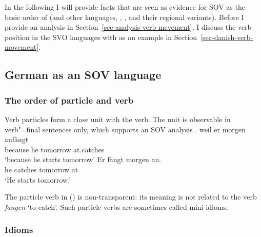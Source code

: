 
In the following I will provide facts that are seen as evidence for SOV as the basic order of 
(and other  languages, \eg {}, ,  and their regional
variants). Before I provide an analysis in Section~\ref{sec-analysis-verb-mevement}, I discuss the 
verb position in the  SVO languages with  as an example in Section~\ref{sec-danish-verb-movement}.

\subsection{German as an SOV language}
\label{sec-German-as-SOV}

\subsubsection{The order of particle and verb}

Verb particles form a close unit with the verb. The unit is observable in verb"=final sentences only,
which supports an SOV analysis \citep[]{Bierwisch63a}. 
\eal
\ex 
\gll weil er morgen anfängt\\
     because he tomorrow at.catches\\
\glt `because he starts tomorrow'
\ex 
\gll Er fängt morgen an.\\
     he catches tomorrow at\\
\glt `He starts tomorrow.'
\zl

\largerpage
\noindent
The particle verb in () is non-transparent: its meaning is not related to the verb
\emph{fangen} `to catch'. Such particle verbs are sometimes called mini
idioms. 

\subsubsection{Idioms}

